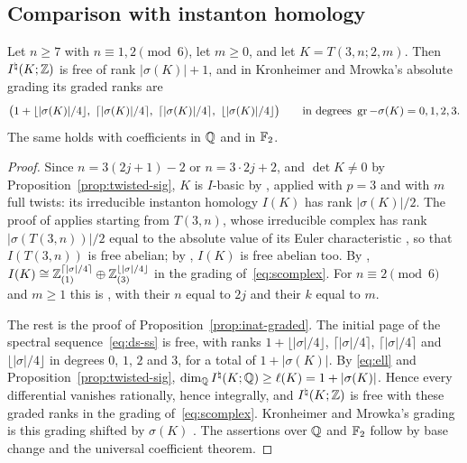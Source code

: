 \subsection{Comparison with instanton homology}\label{ss:twisted-inat}

\begin{proposition}\label{prop:twisted-inat}
Let $n\ge7$ with $n\equiv1,2\pmod6$, let $m\ge0$, and let $K=T(3,n;2,m)$. Then $I^{\natural}(K;\mathbb{Z})$ is free of rank
$|\sigma(K)|+1$, and in Kronheimer and Mrowka's absolute grading its graded ranks are
\[
\bigl(1+\lfloor|\sigma(K)|/4\rfloor,\ \lceil|\sigma(K)|/4\rceil,\ \lceil|\sigma(K)|/4\rceil,\ \lfloor|\sigma(K)|/4\rfloor\bigr)
\qquad\text{in degrees }\gr-\sigma(K)=0,1,2,3 .
\]
The same holds with coefficients in $\mathbb{Q}$ and in $\mathbb{F}_2$.
\end{proposition}

\begin{proof}
Since $n=3(2j+1)-2$ or $n=3\cdot2j+2$, and $\det K\ne0$ by Proposition~\ref{prop:twisted-sig}, $K$ is
$I$-basic by \cite[Prop.~8.31]{DS24}, applied with $p=3$ and with $m$ full twists: its irreducible instanton homology $I(K)$ has rank $|\sigma(K)|/2$. The
proof of \cite[Prop.~8.31]{DS24} applies \cite[Lemma~8.23]{DS24} starting from $T(3,n)$, whose irreducible
complex has rank $|\sigma(T(3,n))|/2$ equal to the absolute value of its Euler characteristic
\cite[Ex.~8.11]{DS24}, so that $I(T(3,n))$ is free abelian; by \cite[Rem.~8.27]{DS24}, $I(K)$ is free abelian too.
By \cite[Prop.~8.28]{DS24}, $I(K)\cong\mathbb{Z}_{(1)}^{\lceil|\sigma|/4\rceil}\oplus\mathbb{Z}_{(3)}^{\lfloor|\sigma|/4\rfloor}$ in the grading
of~\eqref{eq:scomplex}. For $n\equiv2\pmod6$ and $m\ge1$ this is \cite[Cor.~8.36]{DS24}, with their $n$ equal
to $2j$ and their $k$ equal to $m$.

The rest is the proof of Proposition~\ref{prop:inat-graded}. The initial page of the spectral
sequence~\eqref{eq:ds-ss} is free, with ranks $1+\lfloor|\sigma|/4\rfloor$, $\lceil|\sigma|/4\rceil$,
$\lceil|\sigma|/4\rceil$ and $\lfloor|\sigma|/4\rfloor$ in degrees $0$, $1$, $2$ and $3$, for a total of $1+|\sigma(K)|$. By
\eqref{eq:ell} and Proposition~\ref{prop:twisted-sig}, $\dim_{\mathbb{Q}}I^{\natural}(K;\mathbb{Q})\ge\ell(K)=1+|\sigma(K)|$. Hence every
differential vanishes rationally, hence integrally, and $I^{\natural}(K;\mathbb{Z})$ is free with these graded ranks in the
grading of~\eqref{eq:scomplex}. Kronheimer and Mrowka's grading is this grading shifted by
$\sigma(K)$ \cite[Thm.~8.9]{DS19}. The assertions over $\mathbb{Q}$ and $\mathbb{F}_2$ follow by base change and the universal
coefficient theorem.
\end{proof}


